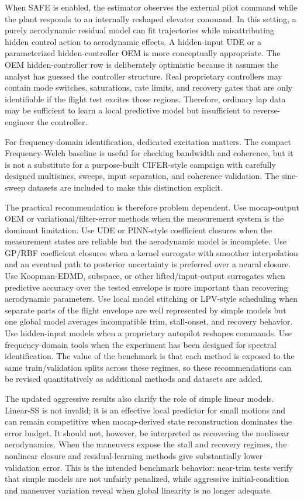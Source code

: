 \documentclass[11pt]{article}
\begin{document}
When SAFE is enabled, the estimator observes the external pilot command while
the plant responds to an internally reshaped elevator command. In this setting,
a purely aerodynamic residual model can fit trajectories while misattributing
hidden control action to aerodynamic effects. A hidden-input UDE or a
parameterized hidden-controller OEM is more conceptually appropriate. The OEM
hidden-controller row is deliberately optimistic because it assumes the analyst
has guessed the controller structure. Real proprietary controllers may contain
mode switches, saturations, rate limits, and recovery gates that are only
identifiable if the flight test excites those regions. Therefore, ordinary lap
data may be sufficient to learn a local predictive model but insufficient to
reverse-engineer the controller.

For frequency-domain identification, dedicated excitation matters. The compact
Frequency-Welch baseline is useful for checking bandwidth and coherence, but it
is not a substitute for a purpose-built CIFER-style campaign with carefully
designed multisines, sweeps, input separation, and coherence validation. The
sine-sweep datasets are included to make this distinction explicit.

The practical recommendation is therefore problem dependent. Use mocap-output
OEM or variational/filter-error methods when the measurement system is the
dominant limitation. Use UDE or PINN-style coefficient closures when the
measurement states are reliable but the aerodynamic model is incomplete. Use
GP/RBF coefficient closures when a kernel surrogate with smoother interpolation
and an eventual path to posterior uncertainty is preferred over a neural
closure. Use Koopman-EDMD, subspace, or other lifted/input-output surrogates
when predictive accuracy over the tested envelope is more important than
recovering aerodynamic parameters. Use local model stitching or LPV-style
scheduling when separate parts of the flight envelope are well represented by
simple models but one global model averages incompatible trim, stall-onset, and
recovery behavior. Use
hidden-input models when a proprietary autopilot reshapes commands. Use
frequency-domain tools when the experiment has been designed for spectral
identification. The value of the benchmark is that each method is exposed to
the same train/validation splits across these regimes, so these recommendations
can be revised quantitatively as additional methods and datasets are added.

The updated aggressive results also clarify the role of simple linear models.
Linear-SS is not invalid; it is an effective local predictor for small motions
and can remain competitive when mocap-derived state reconstruction dominates
the error budget. It should not, however, be interpreted as recovering the
nonlinear aerodynamics. When the maneuvers expose the stall and recovery
regimes, the nonlinear closure and residual-learning methods give substantially
lower validation error. This is the intended benchmark behavior: near-trim tests
verify that simple models are not unfairly penalized, while aggressive
initial-condition and maneuver variation reveal when global linearity is no
longer adequate.
\end{document}
